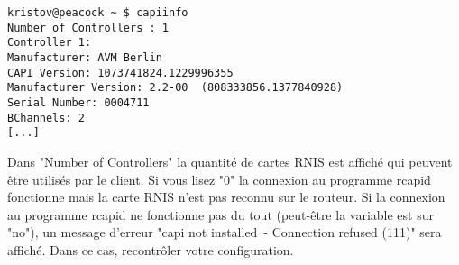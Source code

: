 \begin{example}
\begin{verbatim}
kristov@peacock ~ $ capiinfo 
Number of Controllers : 1
Controller 1:
Manufacturer: AVM Berlin
CAPI Version: 1073741824.1229996355
Manufacturer Version: 2.2-00  (808333856.1377840928)
Serial Number: 0004711
BChannels: 2
[...]
\end{verbatim}
\end{example}

Dans "Number of Controllers" la quantité de cartes RNIS est affiché qui peuvent
être utilisés par le client. Si vous lisez "0" la connexion au programme rcapid
fonctionne mais la carte RNIS n'est pas reconnu sur le routeur. Si la connexion
au programme rcapid ne fonctionne pas du tout (peut-être la variable
 est sur "no"), un message d'erreur "capi not installed~-
Connection refused (111)" sera affiché. Dans ce cas, recontrôler votre configuration.

